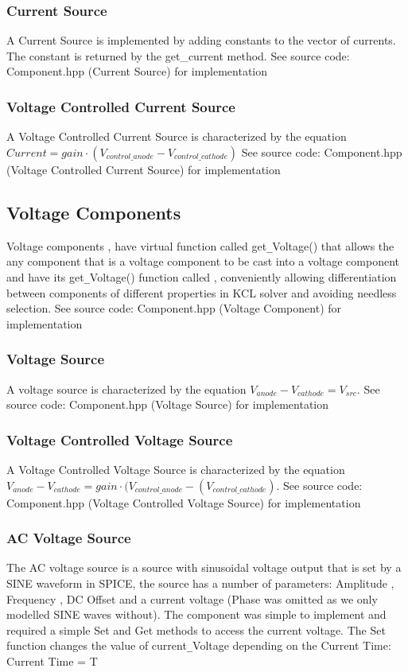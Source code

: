 \documentclass{article}
\begin{document}
\subsubsection{Current Source}
A Current Source is implemented by adding constants to the vector of currents. The constant is returned by the get\_current method.\bigbreak
See source code: Component.hpp (Current Source) for implementation
\subsubsection{Voltage Controlled Current Source}
A Voltage Controlled Current Source is characterized by the equation $ Current = gain\cdot(V_{control\_anode}-V_{control\_cathode})$
\bigbreak
See source code: Component.hpp (Voltage Controlled Current Source) for implementation
\newpage
\subsection{Voltage Components}
Voltage components , have virtual function called get\verb|_|Voltage() that allows the any component that is a voltage component to be cast into a voltage component and have its get\verb|_|Voltage() function called , conveniently allowing differentiation between components of different properties in KCL solver and avoiding needless selection.
\bigbreak
See source code: Component.hpp (Voltage Component) for implementation

\subsubsection{Voltage Source}
A voltage source is characterized by the equation $V_{anode}-V_{cathode}=V_{src}$. \bigbreak
See source code: Component.hpp (Voltage Source) for implementation

\subsubsection{Voltage Controlled Voltage Source}
A Voltage Controlled Voltage Source is characterized by the equation
$V_{anode}-V_{cathode}=gain\cdot(V_{control\_anode}-(V_{control\_cathode})$.
\bigbreak
See source code: Component.hpp (Voltage Controlled Voltage Source) for implementation


\subsubsection{AC Voltage Source}
The AC voltage source is a source with sinusoidal voltage output that is set by a SINE waveform in SPICE, the source has a number of parameters: Amplitude , Frequency , DC Offset and a current voltage (Phase was omitted as we only modelled SINE waves without). The component was simple to implement and required a simple Set and Get methods to access the current voltage. 
The Set function changes the value of current\verb|_|Voltage depending on the Current Time: Current Time = T
\medbreak
\end{document}
